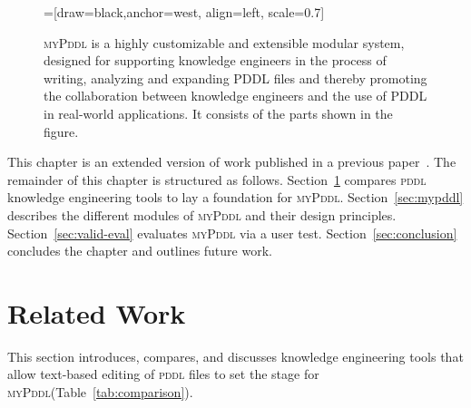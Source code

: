 \documentclass[runningheads]{llncs}
\newcommand{\mypddl}{\textsc{myPddl}\xspace}
\newcommand{\pddl}{\textsc{pddl}\xspace}
\begin{document}
\begin{figure}[H]
  \centering
  =[draw=black,anchor=west,
  align=left,
  scale=0.7]
    \caption{\mypddl is a highly customizable and extensible modular
    system, designed for supporting knowledge engineers in the process
    of writing, analyzing and expanding PDDL files and thereby
    promoting the collaboration between knowledge engineers and the
    use of PDDL in real-world applications. It consists of the parts
    shown in the figure.}
  \label{fig:mypddl-overview}  
\end{figure}

This chapter is an extended version of work published in a previous
paper~\cite{StrKir2014:aai}. The remainder of this chapter is
structured as follows. Section~\ref{sec:related-work} compares \pddl
knowledge engineering tools to lay a foundation for
\mypddl. Section~\ref{sec:mypddl} describes the different modules of
\mypddl and their design principles. Section~\ref{sec:valid-eval}
evaluates \mypddl via a user test. Section~\ref{sec:conclusion}
concludes the chapter and outlines future work.

\section{Related Work}
\label{sec:related-work}

This section introduces, compares, and discusses knowledge engineering
tools that allow text-based editing of \textsc{pddl} files to set the
stage for \mypddl (Table~\ref{tab:comparison}).
\end{document}
